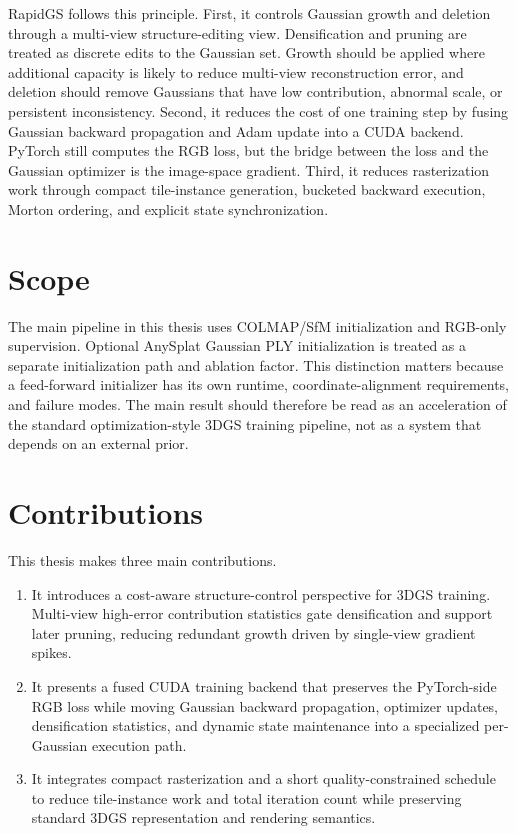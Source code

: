 RapidGS follows this principle. First, it controls Gaussian growth and deletion through a multi-view structure-editing view. Densification and pruning are treated as discrete edits to the Gaussian set. Growth should be applied where additional capacity is likely to reduce multi-view reconstruction error, and deletion should remove Gaussians that have low contribution, abnormal scale, or persistent inconsistency. Second, it reduces the cost of one training step by fusing Gaussian backward propagation and Adam update into a CUDA backend. PyTorch still computes the RGB loss, but the bridge between the loss and the Gaussian optimizer is the image-space gradient. Third, it reduces rasterization work through compact tile-instance generation, bucketed backward execution, Morton ordering, and explicit state synchronization.

\section{Scope}

The main pipeline in this thesis uses COLMAP/SfM initialization and RGB-only supervision. Optional AnySplat Gaussian PLY initialization is treated as a separate initialization path and ablation factor. This distinction matters because a feed-forward initializer has its own runtime, coordinate-alignment requirements, and failure modes. The main result should therefore be read as an acceleration of the standard optimization-style 3DGS training pipeline, not as a system that depends on an external prior.

\section{Contributions}

This thesis makes three main contributions.

\begin{enumerate}
  \item It introduces a cost-aware structure-control perspective for 3DGS training. Multi-view high-error contribution statistics gate densification and support later pruning, reducing redundant growth driven by single-view gradient spikes.
  \item It presents a fused CUDA training backend that preserves the PyTorch-side RGB loss while moving Gaussian backward propagation, optimizer updates, densification statistics, and dynamic state maintenance into a specialized per-Gaussian execution path.
  \item It integrates compact rasterization and a short quality-constrained schedule to reduce tile-instance work and total iteration count while preserving standard 3DGS representation and rendering semantics.
\end{enumerate}
